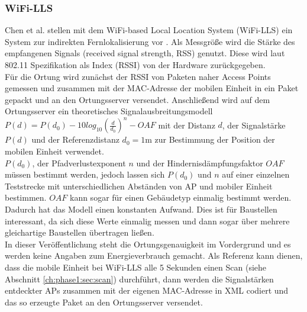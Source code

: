 \subsubsection{WiFi-LLS}
\label{ch:Vorherige:sec:LLS}
Chen et al. stellen mit dem WiFi-based Local Location System (WiFi-LLS) ein System zur indirekten Fernlokalisierung vor \cite{chen2007design}.
Als Messgröße wird die Stärke des empfangenen Signals (received signal strength, RSS) genutzt. 
Diese wird laut 802.11 Spezifikation als Index (RSSI) von der Hardware zurückgegeben. \\
Für die Ortung wird zunächst der RSSI von Paketen naher Access Points gemessen und zusammen mit der MAC-Adresse der mobilen Einheit in ein Paket gepackt und an den Ortungsserver versendet.
Anschließend wird auf dem Ortungsserver ein theoretisches Signalausbreitungsmodell $P(d) = P(d_0) - 10log_{10}(\frac{d}{d_0})^n - OAF$ mit der Distanz $d$, der Signalstärke $P(d)$ und der Referenzdistanz $d_0 = 1$m zur Bestimmung der Position der mobilen Einheit verwendet. \\
$P(d_0)$, der Pfadverlustexponent $n$ und der Hindernisdämpfungsfaktor $OAF$ müssen bestimmt werden, jedoch lassen sich $P(d_0)$ und $n$ auf einer einzelnen Teststrecke mit unterschiedlichen Abständen von AP und mobiler Einheit bestimmen. $OAF$ kann sogar für einen Gebäudetyp einmalig bestimmt werden.
Dadurch hat das Modell einen konstanten Aufwand. 
Dies ist für Baustellen interessant, da sich diese Werte einmalig messen und dann sogar über mehrere gleichartige Baustellen übertragen ließen.\\
In dieser Veröffentlichung steht die Ortungsgenauigkeit im Vordergrund und es werden keine Angaben zum Energieverbrauch gemacht. 
Als Referenz kann dienen, dass die mobile Einheit bei WiFi-LLS alle 5 Sekunden einen Scan (siehe Abschnitt \ref{ch:phase1:sec:scan}) durchführt, dann werden die Signalstärken entdeckter APs zusammen mit der eigenen MAC-Adresse in XML codiert und das so erzeugte Paket an den Ortungsserver versendet.

